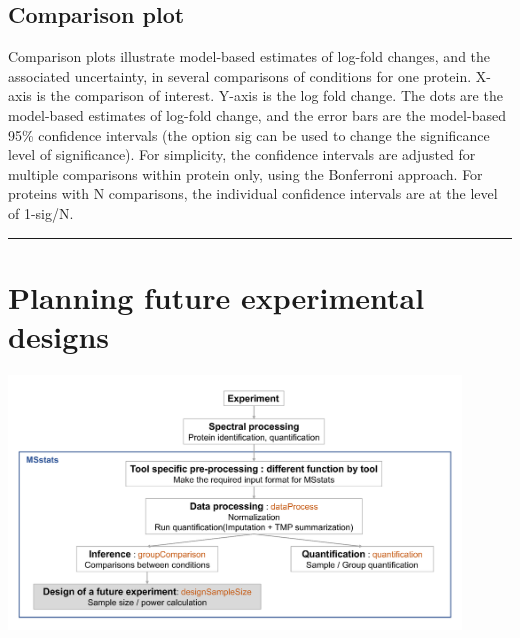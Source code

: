 \documentclass[]{book}
\newenvironment{Shaded}{\begin{snugshade}}{\end{snugshade}}
\newcommand{\DataTypeTok}[1]{\textcolor[rgb]{0.13,0.29,0.53}{#1}}
\newcommand{\KeywordTok}[1]{\textcolor[rgb]{0.13,0.29,0.53}{\textbf{#1}}}
\newcommand{\NormalTok}[1]{#1}
\newcommand{\OperatorTok}[1]{\textcolor[rgb]{0.81,0.36,0.00}{\textbf{#1}}}
\newcommand{\StringTok}[1]{\textcolor[rgb]{0.31,0.60,0.02}{#1}}
\begin{document}
\hypertarget{comparison-plot}{%
\subsection{Comparison plot}\label{comparison-plot}}

Comparison plots illustrate model-based estimates of log-fold changes, and the associated uncertainty, in several comparisons of conditions for one protein. X-axis is the comparison of interest. Y-axis is the log fold change. The dots are the model-based estimates of log-fold change, and the error bars are the model-based 95\% confidence intervals (the option sig can be used to change the significance level of significance). For simplicity, the confidence intervals are adjusted for multiple comparisons within protein only, using the Bonferroni approach. For proteins with N comparisons, the individual confidence intervals are at the level of 1-sig/N.

\begin{Shaded}
\end{Shaded}

\begin{center}\rule{0.5\linewidth}{\linethickness}\end{center}

\hypertarget{planning-future-experimental-designs}{%
\section{Planning future experimental designs}\label{planning-future-experimental-designs}}

\includegraphics[width=0.9\textwidth,height=\textheight]{img/MSstats_workflow_design.png}
\end{document}
